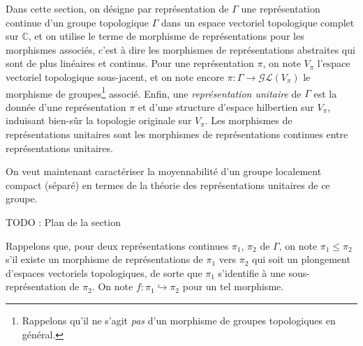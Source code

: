 \documentclass[a4paper,12pt]{article}
\newcommand{\C}{\mathbb{C}}
\newcommand{\TODO}[1]{{\color{red}TODO :} #1}
\begin{document}
Dans cette section, on désigne par \og{}représentation de $\Gamma$\fg{} une représentation continue d'un
groupe topologique $\Gamma$ dans un espace vectoriel topologique complet sur $\C$, et on utilise le terme de \og{}morphisme 
de représentations\fg{} pour les morphismes associés, c'est à dire les morphismes de représentations abstraites
qui sont de plus linéaires et continus. Pour une représentation $\pi$, on note $V_\pi$ l'espace 
vectoriel topologique sous-jacent, et on note encore $\pi : \Gamma\to\mathcal{GL}(V_\pi)$ le morphisme 
de groupes\footnote{Rappelons qu'il ne s'agit \emph{pas} d'un morphisme de groupes topologiques en général.} associé.
Enfin, une \emph{représentation unitaire} de $\Gamma$ est la donnée d'une représentation $\pi$ et d'une structure 
d'espace hilbertien sur $V_\pi$, induisant bien-sûr la topologie originale sur $V_\pi$. Les morphismes de représentations 
unitaires sont les morphismes de représentations continues entre représentations unitaires.

On veut maintenant caractériser la moyennabilité d'un groupe localement compact (séparé) en termes
de la théorie des représentations unitaires de ce groupe. 

\TODO{Plan de la section}

Rappelons que, pour deux représentations continues $\pi_1$, $\pi_2$ de $\Gamma$, on note 
$\pi_1\le\pi_2$ s'il existe un morphisme de représentations de $\pi_1$ vers $\pi_2$ qui soit un plongement
d'espaces vectoriels topologiques, de sorte que $\pi_1$ s'identifie à une sous-représentation de $\pi_2$.
On note $f : \pi_1\hookrightarrow\pi_2$ pour un tel morphisme.

\end{document}
